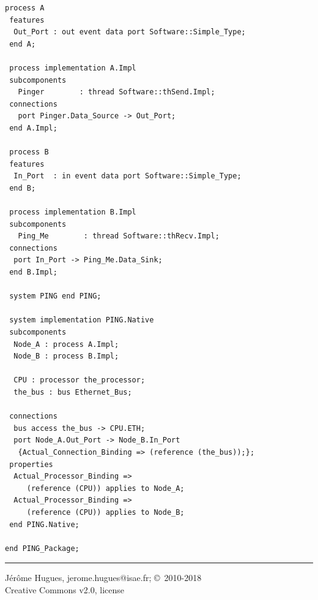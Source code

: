\documentclass[10pt,landscape,letterpaper]{article}
\begin{document}
\begin{multicols}{3}
{\begin{lstlisting}[language=aadl]
 process A
 features
  Out_Port : out event data port Software::Simple_Type;
 end A;

 process implementation A.Impl
 subcomponents
   Pinger        : thread Software::thSend.Impl;
 connections
   port Pinger.Data_Source -> Out_Port;
 end A.Impl;

 process B
 features
  In_Port  : in event data port Software::Simple_Type;
 end B;

 process implementation B.Impl
 subcomponents
   Ping_Me        : thread Software::thRecv.Impl;
 connections
  port In_Port -> Ping_Me.Data_Sink;
 end B.Impl;

 system PING end PING;

 system implementation PING.Native
 subcomponents
  Node_A : process A.Impl;
  Node_B : process B.Impl;

  CPU : processor the_processor;
  the_bus : bus Ethernet_Bus;

 connections
  bus access the_bus -> CPU.ETH;
  port Node_A.Out_Port -> Node_B.In_Port
   {Actual_Connection_Binding => (reference (the_bus));};
 properties
  Actual_Processor_Binding =>
     (reference (CPU)) applies to Node_A;
  Actual_Processor_Binding =>
     (reference (CPU)) applies to Node_B;
 end PING.Native;

end PING_Package;
\end{lstlisting}
}

\rule{0.3\linewidth}{0.25pt}
\scriptsize

J\'er\^ome Hugues, jerome.hugues@isae.fr; \copyright\ 2010-2018 \\
Creative Commons v2.0, \bynd license
\end{multicols}
\end{document}

